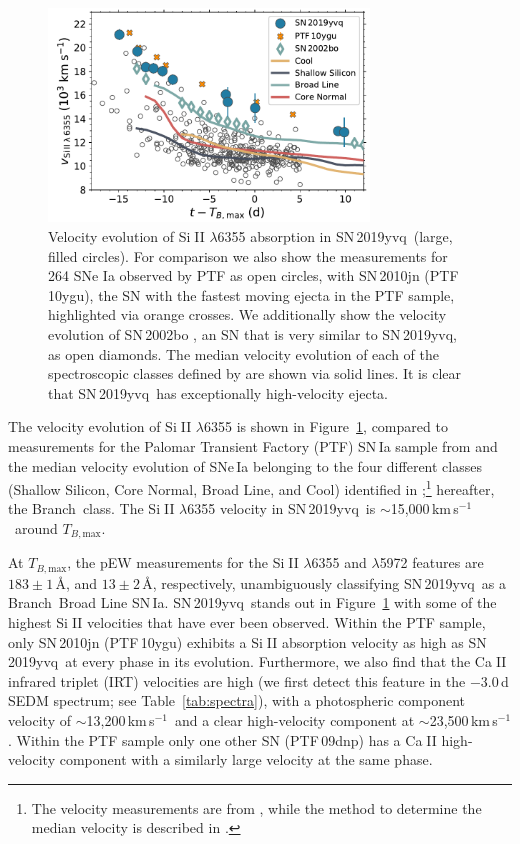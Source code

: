 \documentclass[twocolumn]{aastex63}
\def\ion#1#2{#1$\;${\footnotesize\rm{#2}}\relax}
\newcommand{\tbmax}{$T_{B,\mathrm{max}}$}
\newcommand{\kms}{km\,s$^{-1}$}
\newcommand{\sn}{SN\,2019yvq}
\begin{document}
\begin{figure}
    \centering
    \includegraphics[width=3.35in]{./figures/vel_evolution.pdf}
    \caption{Velocity evolution of \ion{Si}{II} $\lambda$6355 absorption in
    \sn\ (large, filled circles). For comparison we also show the measurements
    for 264 SNe Ia observed by PTF \citep[data
    from][]{Maguire14} as open circles, with SN\,2010jn (PTF\,10ygu), the SN
    with the fastest moving ejecta in the PTF sample, highlighted via orange
    crosses. We additionally show the velocity evolution of SN\,2002bo
    \citep[data from][]{Benetti04}, an SN that is very similar to \sn, as open
    diamonds. The median velocity evolution of each of the spectroscopic
    classes defined by \citet[][Shallow Silicon, Core Normal, Broad Line, and
    Cool]{Branch06} are shown via solid lines. It is clear that \sn\ has
    exceptionally high-velocity ejecta.}%
    \label{fig:vel_evo}
\end{figure}

The velocity evolution of \ion{Si}{II} $\lambda$6355 is shown in
Figure~\ref{fig:vel_evo}, compared to measurements for the Palomar Transient
Factory (PTF) SN\,Ia sample from \citet{Maguire14} and the median velocity
evolution of SNe\,Ia belonging to the four different classes (Shallow Silicon,
Core Normal, Broad Line, and Cool) identified in
\citet{Branch06};\footnote{The velocity measurements are from
\citet{Blondin12}, while the method to determine the median velocity is
described in \citet{Miller18}.} hereafter, the Branch~class. The \ion{Si}{II}
$\lambda$6355 velocity in \sn\ is $\sim$15,000\,\kms\ around \tbmax.

At \tbmax, the pEW measurements for the \ion{Si}{II} $\lambda$6355 and
$\lambda$5972 features are $183\pm1$\,\AA, and $13\pm2$\,\AA, respectively,
unambiguously classifying \sn\ as a Branch~Broad Line SN\,Ia. \sn\ stands out
in Figure~\ref{fig:vel_evo} with some of the highest \ion{Si}{II} velocities
that have ever been observed. Within the PTF sample, only SN\,2010jn
(PTF\,10ygu) exhibits a \ion{Si}{II} absorption velocity as high as \sn\ at
every phase in its evolution. Furthermore, we also find that the \ion{Ca}{II}
infrared triplet (IRT) velocities are high (we first detect this feature in
the $-3.0$\,d SEDM spectrum; see Table~\ref{tab:spectra}), with a photospheric
component velocity of $\sim$13,200\,\kms\ and a clear high-velocity component
at $\sim$23,500\,\kms. Within the PTF sample only one other SN (PTF\,09dnp)
has a \ion{Ca}{II} high-velocity component with a similarly large velocity at
the same phase.
\end{document}
